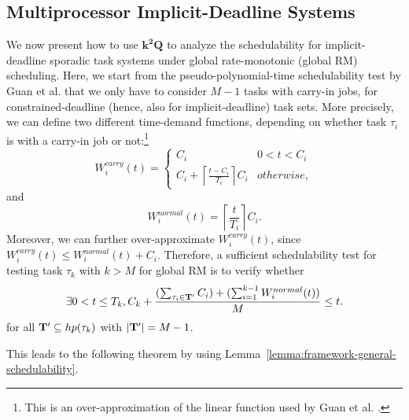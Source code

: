 \documentclass[10pt,conference]{IEEEtran}
\newcommand{\ceiling}[1]{\left\lceil{#1}\right\rceil}
\newcommand{\frameworkkq}[1]{$\mathbf{k^2Q}$}
\begin{document}
\subsection{Multiprocessor Implicit-Deadline Systems}  

We now present how to use \frameworkkq{} to analyze the schedulability
for implicit-deadline sporadic task systems under global
rate-monotonic (global RM) scheduling. Here, we start from the
pseudo-polynomial-time schedulability test by Guan et
al. \cite{DBLP:conf/rtss/GuanSYY09} that we only have to consider
$M-1$ tasks with carry-in jobs, for constrained-deadline (hence, also
for implicit-deadline) task sets.  More precisely, we can define two
different time-demand functions, depending on whether task $\tau_i$ is
with a carry-in job or not:\footnote{This is an over-approximation of
  the linear function used by Guan et
  al. \cite{DBLP:conf/rtss/GuanSYY09}.}
\begin{equation}
  \label{eq:W_i-carryin}
W_i^{carry}(t) =
\begin{cases}
  C_i & 0 < t < C_i\\
  C_i + \ceiling{\frac{t-C_i}{T_i}}C_i & otherwise,
\end{cases}
\end{equation}
and
\begin{equation}
  \label{eq:W_i-normal}
W_i^{normal}(t) = \ceiling{\frac{t}{T_i}}C_i.
\end{equation}
Moreover, we can further over-approximate $W_i^{carry}(t)$, since  $W_i^{carry}(t) \leq W_i^{normal}(t)+C_i$. Therefore, a sufficient schedulability test for testing task $\tau_k$ with $k > M$ for global RM is to verify whether 
\begin{equation}
  \label{eq:grm-multiprocessor-M-1-carryin}
\exists 0 < t \leq T_k, C_k + \frac{(\sum_{\tau_i \in {\bf T}'} C_i) +  (\sum_{i=1}^{k-1}W_i^{normal}(t)) }{M} \leq t.  
\end{equation}
for all ${\bf T}' \subseteq hp(\tau_k)$ with $|{\bf T}'| = M-1$.

This leads to the following theorem by using
Lemma~\ref{lemma:framework-general-schedulability}. 
\end{document}
